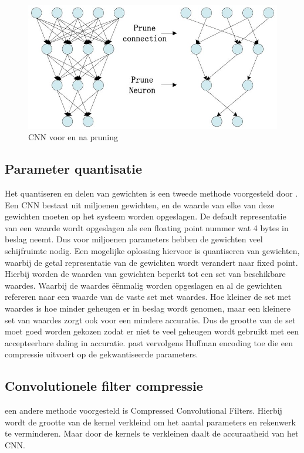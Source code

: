 \begin{figure}[!ht]
	\centering
	\includegraphics[width=0.65\linewidth]{fig/pruning.jpg}
	\caption{CNN voor en na pruning}
	\label{fig:pruning}
\end{figure}

\subsection{Parameter quantisatie}
Het quantiseren en delen van gewichten is een tweede methode voorgesteld door \cite{han_deep_2016}.
Een CNN bestaat uit miljoenen gewichten, en de waarde van elke van deze gewichten moeten op het systeem worden opgeslagen.
De default representatie van een waarde wordt opgeslagen als een floating point nummer wat 4 bytes in beslag neemt.
Dus voor miljoenen parameters hebben de gewichten veel schijfruimte nodig.
Een mogelijke oplossing hiervoor is quantiseren van gewichten, waarbij de getal representatie van de gewichten wordt verandert naar fixed point.
Hierbij worden de waarden van gewichten beperkt tot een set van beschikbare waardes.
Waarbij de waardes \"e\"enmalig worden opgeslagen en al de gewichten refereren naar een waarde van de vaste set met waardes.
Hoe kleiner de set met waardes is hoe minder geheugen er in beslag wordt genomen, maar een kleinere set van waardes zorgt ook voor een mindere accuratie.
Dus de grootte van de set moet goed worden gekozen zodat er niet te veel geheugen wordt gebruikt met een accepteerbare daling in accuratie.
\cite{han_deep_2016} past vervolgens Huffman encoding toe die een compressie uitvoert op de gekwantiseerde parameters.

\subsection{Convolutionele filter compressie}
een andere methode voorgesteld is Compressed Convolutional Filters.
Hierbij wordt de grootte van de kernel verkleind om het aantal parameters en rekenwerk te verminderen.
Maar door de kernels te verkleinen daalt de accuraatheid van het CNN.

